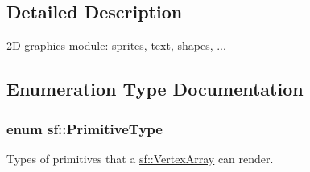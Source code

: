 \subsection{Detailed Description}
2\-D graphics module\-: sprites, text, shapes, ... 

\subsection{Enumeration Type Documentation}
\hypertarget{group__graphics_ga5ee56ac1339984909610713096283b1b}{
\subsubsection[{Primitive\-Type}]{\setlength{\rightskip}{0pt plus 5cm}enum {\bf sf\-::\-Primitive\-Type}}}\label{group__graphics_ga5ee56ac1339984909610713096283b1b}


Types of primitives that a \hyperlink{classsf_1_1_vertex_array}{sf\-::\-Vertex\-Array} can render. 

